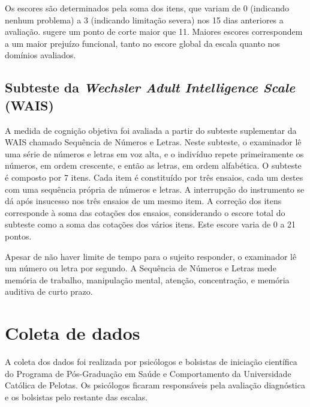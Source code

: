 \documentclass[chapter=TITLE,
               oneside,
               12pt,
               a4paper,
               english,
               brazil]{abntex2}    %
\begin{document}
            Os escores são determinados pela soma dos itens, que variam de
            0 (indicando nenhum problema) a 3 (indicando limitação severa)
            nos 15 dias anteriores a avaliação.
            \textcite{rosa_validity_2007} sugere um ponto de corte maior
            que 11.
            Maiores escores correspondem a um maior prejuízo funcional,
            tanto no escore global da escala quanto nos domínios avaliados.
    
        \subsection{Subteste da \textit{Wechsler Adult Intelligence Scale} (WAIS)}
        \label{sec:wais}
    
            A medida de cognição objetiva foi avaliada a partir do subteste
            suplementar da WAIS chamado Sequência de Números e Letras.
            Neste subteste, o examinador lê uma série de números e
            letras em voz alta, e o indivíduo repete primeiramente os números,
            em ordem crescente, e então as letras, em ordem alfabética.
            O subteste é composto por 7 itens.
            Cada item é constituído por três ensaios, cada um destes com uma
            sequência própria de números e letras.
            A interrupção do instrumento se dá após insucesso nos três ensaios
            de um mesmo item.
            A correção dos itens corresponde à soma das cotações dos ensaios,
            considerando o escore total do subteste como a soma das cotações
            dos vários itens. Este escore varia de 0 a 21 pontos.
    
            Apesar de não haver limite de tempo para o sujeito responder,
            o examinador lê um número ou letra por segundo.
            A Sequência de Números e Letras mede memória de trabalho,
            manipulação mental, atenção, concentração,
            e memória auditiva de curto prazo. \parencite{wechsler_wais_2004}

\section{Coleta de dados}\label{sec:coleta}

    A coleta dos dados foi realizada por psicólogos e bolsistas de iniciação
    científica do Programa de Pós-Graduação em Saúde e Comportamento da
    Universidade Católica de Pelotas.
    Os psicólogos ficaram responsáveis pela avaliação
    diagnóstica e os bolsistas pelo restante das escalas.
\end{document}
